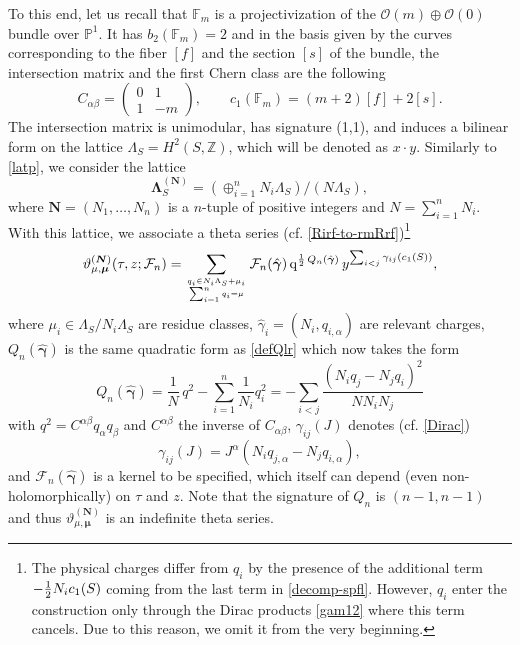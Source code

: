 \documentclass[12pt,letterpaper]{JHEP3}
\def\be{\begin{equation}}
\def\ee{\end{equation}}
\def\({\left(}
\def\){\right)}
\def\hf{{1\over 2}}
\newcommand{\vth}{\vartheta}
\newcommand{\cF}{\mathcal{F}}
\newcommand{\cO}{\mathcal{O}}
\newcommand{\IZ}{\mathds{Z}}
\newcommand{\IF}{\mathds{F}}
\newcommand{\IP}{\mathds{P}}
\newcommand{\bfN}{{\boldsymbol N}}
\newcommand{\bfmu}{{\boldsymbol \mu}}
\newcommand{\bfLam}{{\boldsymbol \Lambda}}
\newcommand{\bfgam}{{\boldsymbol \gamma}}
\def\hgam{\hat\gamma}
\def\bfhgam{\hat\bfgam}
\def\vth{\vartheta}
\newcommand{\q}{\mathrm{q}}
\begin{document}
To this end, let us recall that $\IF_m$ is a projectivization of the $\cO(m)\oplus \cO(0)$ bundle over $\IP^1$.
It has $b_2(\IF_m)=2$ and in the basis given by the curves corresponding to the fiber $[f]$ and the section $[s]$ of the bundle,
the intersection matrix and the first Chern class are the following
\be
C_{\alpha\beta} = \begin{pmatrix} 0 & 1 \\ 1 & -m \end{pmatrix},
\qquad
c_1(\IF_m) = (m+2)[f]+2[s].
\label{dataFk}
\ee
The intersection matrix is unimodular, has signature (1,1), and induces a bilinear form on the lattice $\Lambda_S=H^2(S,\IZ)$,
which will be denoted as $x\cdot y$.
Similarly to \eqref{latp}, we consider the lattice 
\be 
\bfLam^{(\bfN)}_S =
\(\oplus_{i=1}^n N_i\Lambda_S\)/(N\Lambda_S),
\label{latVW}
\ee
where $\bfN=(N_1,\dots,N_n)$ is a $n$-tuple of positive integers and $N=\sum_{i=1}^n N_i$.
With this lattice, we associate a theta series (cf. \eqref{Rirf-to-rmRrf})\footnote{The physical charges differ from 
	$q_i$ by the presence of the additional term $-\hf N_i c_1(S)$ coming from the last term in \eqref{decomp-spfl}.
	However, $q_i$ enter the construction only through the Dirac products \eqref{gam12} where this term cancels.
	Due to this reason, we omit it from the very beginning.}
\be 
\vth^{(\bfN)}_{\mu,\bfmu}(\tau,z;\cF_n)=
\sum_{q_i\in N_i\Lambda_S+\mu_i\atop \sum_{i=1}^n q_i=\mu}
\cF_n(\bfhgam)\,\q^{\hf\, Q_n(\bfhgam)}\, y^{\sum_{i<j}\gamma_{ij}(c_1(S))},
\label{Theta-bfN}
\ee 
where $\mu_i\in \Lambda_S/N_i\Lambda_S$ are residue classes, 
$\hgam_i=(N_i,q_{i,\alpha})$ are relevant charges, 
$Q_n(\bfhgam)$ is the same quadratic form as \eqref{defQlr} which now takes the form
\be
Q_n(\bfhgam)=
\frac{1}{N}\, q^2-\sum_{i=1}^n \frac{1}{N_i} q_{i}^2
=-\sum_{i<j}\frac{(N_i q_j - N_j q_i)^2}{NN_i N_j}
\label{defQlr-VW}
\ee
with $q^2=C^{\alpha\beta}q_\alpha q_\beta$ and $C^{\alpha\beta}$ the inverse of $C_{\alpha\beta}$,
$\gamma_{ij}(J)$ denotes (cf. \eqref{Dirac})
\be
\label{gam12}
\gamma_{ij}(J)=
J^{\alpha} (N_i q_{j,\alpha} -N_j q_{i,\alpha}),
\ee
and $\cF_n(\bfhgam)$ is a kernel to be specified, which itself can depend (even non-holomorphically) on $\tau$ and $z$.
Note that the signature of $Q_n$ is $(n-1,n-1)$ and thus $\vth^{(\bfN)}_{\mu,\bfmu}$ is an indefinite theta series.
\end{document}
